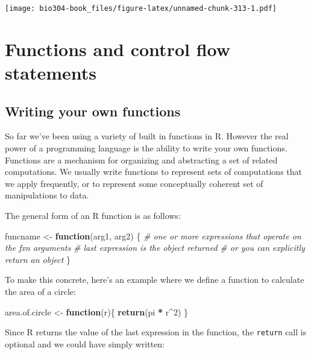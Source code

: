 \documentclass[]{book}
\newenvironment{Shaded}{\begin{snugshade}}{\end{snugshade}}
\newcommand{\CommentTok}[1]{\textcolor[rgb]{0.56,0.35,0.01}{\textit{#1}}}
\newcommand{\ControlFlowTok}[1]{\textcolor[rgb]{0.13,0.29,0.53}{\textbf{#1}}}
\newcommand{\DecValTok}[1]{\textcolor[rgb]{0.00,0.00,0.81}{#1}}
\newcommand{\KeywordTok}[1]{\textcolor[rgb]{0.13,0.29,0.53}{\textbf{#1}}}
\newcommand{\NormalTok}[1]{#1}
\newcommand{\OperatorTok}[1]{\textcolor[rgb]{0.81,0.36,0.00}{\textbf{#1}}}
\newcommand{\StringTok}[1]{\textcolor[rgb]{0.31,0.60,0.02}{#1}}
\theoremstyle{definition}
\theoremstyle{definition}
\theoremstyle{definition}
\theoremstyle{remark}
\begin{document}
\texttt{[image: bio304-book\_files/figure-latex/unnamed-chunk-313-1.pdf]}

\hypertarget{functions-and-control-flow-statements}{%
\chapter{Functions and control flow
statements}\label{functions-and-control-flow-statements}}

\hypertarget{writing-your-own-functions}{%
\section{Writing your own functions}\label{writing-your-own-functions}}

So far we've been using a variety of built in functions in R. However
the real power of a programming language is the ability to write your
own functions. Functions are a mechanism for organizing and abstracting
a set of related computations. We usually write functions to represent
sets of computations that we apply frequently, or to represent some
conceptually coherent set of manipulations to data.

The general form of an R function is as follows:

\begin{Shaded}
\begin{Highlighting}[]
\NormalTok{funcname <-}\StringTok{ }\ControlFlowTok{function}\NormalTok{(arg1, arg2) \{}
 \CommentTok{# one or more expressions that operate on the fxn arguments}
 \CommentTok{# last expression is the object returned}
 \CommentTok{# or you can explicitly return an object}
\NormalTok{\}}
\end{Highlighting}
\end{Shaded}

To make this concrete, here's an example where we define a function to
calculate the area of a circle:

\begin{Shaded}
\begin{Highlighting}[]
\NormalTok{area.of.circle <-}\StringTok{ }\ControlFlowTok{function}\NormalTok{(r)\{}
  \KeywordTok{return}\NormalTok{(pi }\OperatorTok{*}\StringTok{ }\NormalTok{r}\OperatorTok{^}\DecValTok{2}\NormalTok{)}
\NormalTok{\}}
\end{Highlighting}
\end{Shaded}

Since R returns the value of the last expression in the function, the
\texttt{return} call is optional and we could have simply written:
\end{document}
